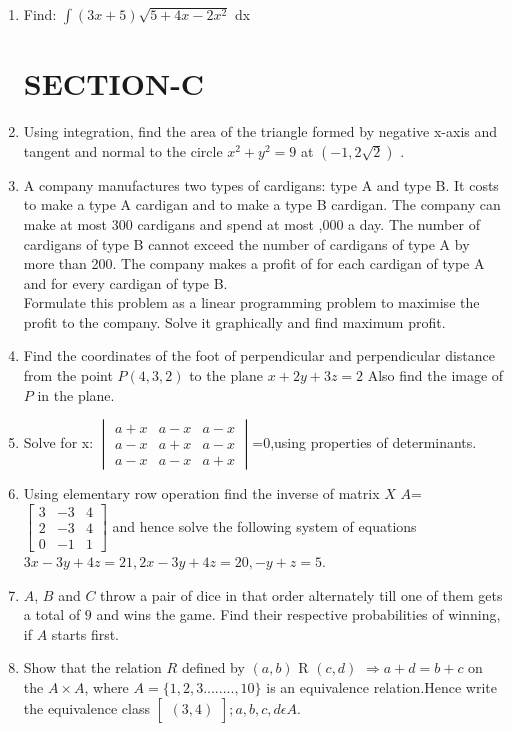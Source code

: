 \documentclass[12pt,-letter paper]{article}
\providecommand{\mydet}[1]{\ensuremath{\begin{vmatrix}#1\end{vmatrix}}}
\providecommand{\myvec}[1]{\ensuremath{\begin{bmatrix}#1\end{bmatrix}}}
\providecommand{\brak}[1]{\ensuremath{\left(#1\right)}}
\begin{document}
\begin{enumerate}
      \item Find: $\int \brak{3x+5}\sqrt {5+4x-2x^2}$ dx

	      \section*{\centering SECTION-C}	      

      \item Using integration, find the area of the triangle formed by negative x-axis and tangent and normal to the circle $x ^ 2 + y ^ 2 = 9$ at $\brak{- 1, 2\sqrt2}$ .  					     
      \item A company manufactures two types of cardigans: type A and type B. It costs  to make a type A cardigan and  to make a type B cardigan. The company can make at most $300$ cardigans and spend at most ,000 a day. The number of cardigans of type B cannot exceed the number of cardigans of type A by more than 200. The company makes a profit of  for each cardigan of type A and  for every cardigan of type B.\\Formulate this problem as a linear programming problem to maximise the profit to the company. Solve it graphically and find maximum profit.

       \item Find the coordinates of the foot of perpendicular and perpendicular distance from the point $P\brak{4, 3, 2}$ to the plane $x + 2y + 3z = 2$ Also find the image of $P$ in the plane.  
       \item  Solve for x: $\mydet{a+x&a-x&a-x\\ a-x&a+x&a-x\\a-x&a-x&a+x}$=$0$,using properties of determinants.
       \item  Using elementary row operation find the inverse of matrix $X$ $A$=$\myvec{3&-3&4\\2&-3&4\\0&-1&1}$ and hence solve the following system of equations $3x-3y+4z=21,2x-3y+4z=20,-y+z=5$.                                                 
        \item $A$, $B$ and $C$ throw a pair of dice in that order alternately till one of them gets a total of $9$ and wins the game. Find their respective probabilities of winning, if $A$ starts first.
       
	\item Show that the relation $R$ defined by \brak{a,b} R \brak{c,d} $\Rightarrow a+d=b+c $ on the $A \times A$, where $A=\{1,2,3........,10\}$ is an equivalence relation.Hence write the equivalence class $\myvec{\brak{3,4}};a,b,c,d \epsilon A$.


\end{enumerate}
\end{document}
